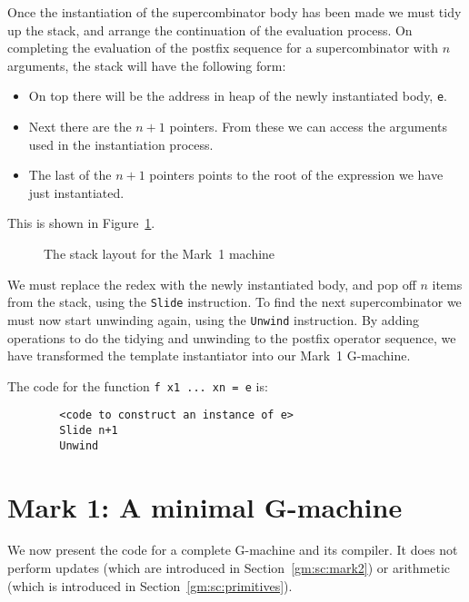 Once the instantiation of the supercombinator body has been made we
must tidy up the stack, and arrange the continuation of the evaluation
process. On completing the evaluation of the postfix sequence for a
supercombinator with $n$ arguments, the stack will have the following
form:
\begin{itemize}

\item On top there will be the address in heap of the newly
instantiated body, \mbox{\tt e}.

\item Next there are the $n+1$ pointers. From these we can access the
arguments used in the instantiation process.

\item The last of the $n+1$ pointers points to the root of the
expression we have just instantiated.

\end{itemize}
This is shown in Figure~\ref{gm:fg:stack}.
\begin{figure} %

\caption{The stack layout for the Mark~1 machine}\label{gm:fg:stack} \end{figure}

We must replace the redex with the newly instantiated body, and pop
off $n$ items from the stack, using the \mbox{\tt Slide} instruction. To find
the next supercombinator we must now start unwinding again, using the
\mbox{\tt Unwind} instruction. By adding operations to do the tidying and
unwinding to the postfix operator sequence, we have transformed the
template instantiator into our Mark~1 G-machine.

The code for the function \mbox{\tt f\ x1\ ...\ xn\ =\ e} is:
\begin{verbatim}
        <code to construct an instance of e>
        Slide n+1
        Unwind
\end{verbatim}

\section{Mark 1: A minimal G-machine}
\label{minimal-gm}

We now present the code for a complete G-machine and its compiler. It
does not perform updates (which are introduced in
Section~\ref{gm:sc:mark2}) or arithmetic (which is introduced in
Section~\ref{gm:sc:primitives}).

